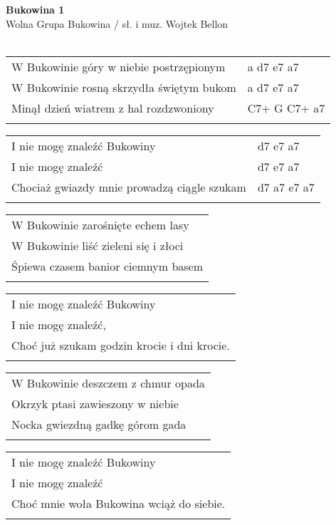 \documentclass[a5paper]{article}
\begin{document}


\noindent
\fontsize{12pt}{15pt}\selectfont
\textbf{Bukowina 1} \\
\fontsize{8pt}{10pt}\selectfont
Wolna Grupa Bukowina / sł. i muz. Wojtek Bellon \\ \\
\fontsize{10pt}{12pt}\selectfont
{}
\begin{tabular}{@{}p{8.3cm}p{3cm}@{}}
\noindent
W Bukowinie góry w niebie postrzępionym & a d7 e7 a7 \\
W Bukowinie rosną skrzydła świętym bukom & a d7 e7 a7 \\
Minął dzień wiatrem z hal rozdzwoniony & C7+ G C7+ a7 \\ \\
\end{tabular}

\noindent
\begin{tabular}{@{}p{7.3cm}p{3cm}@{}}
I nie mogę znaleźć Bukowiny & d7 e7 a7 \\
I nie mogę znaleźć & d7 e7 a7 \\
Chociaż gwiazdy mnie prowadzą ciągle szukam & d7 a7 e7 a7 \\ \\
\end{tabular}

\noindent
\begin{tabular}{@{}p{9.5cm}@{}}
W Bukowinie zarośnięte echem lasy \\
W Bukowinie liść zieleni się i złoci \\
Śpiewa czasem banior ciemnym basem \\ \\
\end{tabular}

\noindent
\begin{tabular}{@{}p{8.5cm}@{}}
I nie mogę znaleźć Bukowiny \\
I nie mogę znaleźć, \\
Choć już szukam godzin krocie i dni krocie. \\ \\
\end{tabular}

\noindent
\begin{tabular}{@{}p{9.5cm}@{}}
W Bukowinie deszczem z chmur opada \\
Okrzyk ptasi zawieszony w niebie \\
Nocka gwiezdną gadkę górom gada \\ \\
\end{tabular}

\noindent
\begin{tabular}{@{}p{8.5cm}@{}}
I nie mogę znaleźć Bukowiny \\
I nie mogę znaleźć \\
Choć mnie woła Bukowina wciąż do siebie. \\ \\
\end{tabular}
\end{document}
